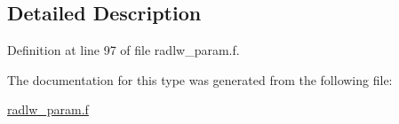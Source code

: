 \subsection{Detailed Description}


Definition at line 97 of file radlw\+\_\+param.\+f.



The documentation for this type was generated from the following file\+:\begin{DoxyCompactItemize}
\item 
\hyperlink{radlw__param_8f}{radlw\+\_\+param.\+f}\end{DoxyCompactItemize}
